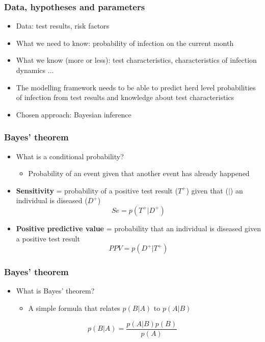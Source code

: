 \documentclass{beamer}
\begin{document}
\begin{frame}
\frametitle{Data, hypotheses and parameters}
\begin{itemize}
 \item{Data: test results, risk factors}
 \item{What we need to know: probability of infection on the current month}
 \item{What we know (more or less): test characteristics, characteristics of infection dynamics $\ldots$}
 \item{The modelling framework needs to be able to predict herd level probabilities of infection from test results and knowledge about test characteristics}
 \item{Chosen approach: Bayesian inference}
\end{itemize}
\end{frame}

\begin{frame}
\frametitle{Bayes’ theorem}
\begin{itemize}
 \item{What is a conditional probability?}
 \begin{itemize}
  \item{Probability of an event given that another event has already happened}
 \end{itemize}
  \medskip
  \item[]{\textbf{Sensitivity} = probability of a positive test result ($T^+$) given that ($|$) an individual is diseased ($D^+$)}
$$Se = p(T^+|D^+)$$
  \item[]{\textbf{Positive predictive value} = probability that an individual is diseased given a positive test result}
  $$PPV = p(D^+|T^+)$$
\end{itemize}
\end{frame}

\begin{frame}
\frametitle{Bayes’ theorem}
\begin{itemize}
 \item{What is Bayes’ theorem?}
 \begin{itemize}
  \item{A simple formula that relates $p(B|A)$ to $p(A|B)$}
 \end{itemize}
\end{itemize}
\vspace{1.5cm}
\huge
$$p(B|A)=\frac{p(A|B)p(B)}{p(A)}$$
\end{frame}
\end{document}
